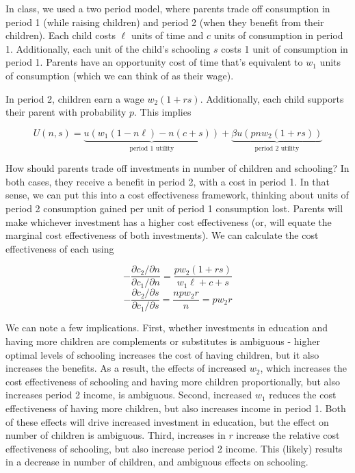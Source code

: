 \documentclass[12pt,english]{article}
\begin{document}
In class, we used a two period model, where parents trade off consumption in period 1 (while raising children) and period 2 (when they benefit from their children). Each child costs $\ell$ units of time and $c$ units of consumption in period 1. Additionally, each unit of the child's schooling $s$ costs 1 unit of consumption in period 1. Parents have an opportunity cost of time that's equivalent to $w_{1}$ units of consumption (which we can think of as their wage).

In period 2, children earn a wage $w_{2} (1 + rs)$. Additionally, each child supports their parent with probability $p$. This implies

$$ U(n, s) = \underbrace{u(w_{1}(1 - n \ell) - n(c + s))}_{\text{period 1 utility}} + \underbrace{\beta u(pnw_{2}(1 + rs))}_{\text{period 2 utility}} $$

How should parents trade off investments in number of children and schooling? In both cases, they receive a benefit in period 2, with a cost in period 1. In that sense, we can put this into a cost effectiveness framework, thinking about units of period 2 consumption gained per unit of period 1 consumption lost. Parents will make whichever investment has a higher cost effectiveness (or, will equate the marginal cost effectiveness of both investments). We can calculate the cost effectiveness of each using

$$ -\frac{\partial c_{2} / \partial n}{\partial c_{1} / \partial n} = \frac{pw_{2}(1 + rs)}{w_{1} \ell + c + s} $$
$$ -\frac{\partial c_{2} / \partial s}{\partial c_{1} / \partial s} = \frac{npw_{2}r}{n} = pw_{2}r $$

We can note a few implications. First, whether investments in education and having more children are complements or substitutes is ambiguous - higher optimal levels of schooling increases the cost of having children, but it also increases the benefits. As a result, the effects of increased $w_{2}$, which increases the cost effectiveness of schooling and having more children proportionally, but also increases period 2 income, is ambiguous. Second, increased $w_{1}$ reduces the cost effectiveness of having more children, but also increases income in period 1. Both of these effects will drive increased investment in education, but the effect on number of children is ambiguous. Third, increases in $r$ increase the relative cost effectiveness of schooling, but also increase period 2 income. This (likely) results in a decrease in number of children, and ambiguous effects on schooling.
\end{document}
